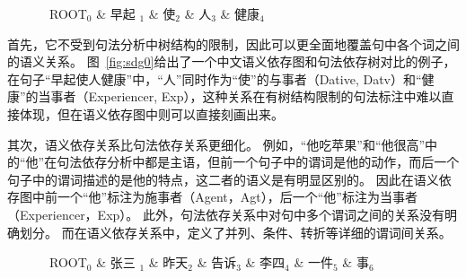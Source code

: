 \begin{figure}[htpb]
	\begin{center}
			\begin{dependency}[arc edge, arc angle=80, text only label, label style={above}]
				\begin{deptext} [row sep=0.6cm, column sep=.5cm]
					\ ROOT$_0$ \& 早起 $_1$ \& 使$_2$ \& 人$_3$ \&  健康$_4$ \\
				\end{deptext}
				
			\end{dependency}
	\end{center}
\end{figure}


首先，它不受到句法分析中树结构的限制，因此可以更全面地覆盖句中各个词之间的语义关系。
图~\ref{fig:sdg0}给出了一个中文语义依存图和句法依存树对比的例子，在句子“早起使人健康”中，“人”同时作为“使”的与事者（Dative, Datv）和“健康”的当事者（Experiencer, Exp），这种关系在有树结构限制的句法标注中难以直接体现，但在语义依存图中则可以直接刻画出来。

其次，语义依存关系比句法依存关系更细化。
例如，“他吃苹果”和“他很高”中的“他”在句法依存分析中都是主语，但前一个句子中的谓词是他的动作，而后一个句子中的谓词描述的是他的特点，这二者的语义是有明显区别的。
因此在语义依存图中前一个“他”标注为施事者（Agent，Agt），后一个“他”标注为当事者（Experiencer，Exp）。
此外，句法依存关系中对句中多个谓词之间的关系没有明确划分。
而在语义依存关系中，定义了并列、条件、转折等详细的谓词间关系。

\begin{figure}[htb]
	\begin{center}
			\begin{dependency}[arc edge, arc angle=80, text only label, label style={above}]
				\begin{deptext} [row sep=0.4cm, column sep=.1cm]
					\ ROOT$_0$ \& 张三 $_1$ \& 昨天$_2$ \& 告诉$_3$ \&  李四$_4$  \& 一件$_5$ \& 事$_6$ \\
				\end{deptext}
			\end{dependency}
	\end{center}
\end{figure}

